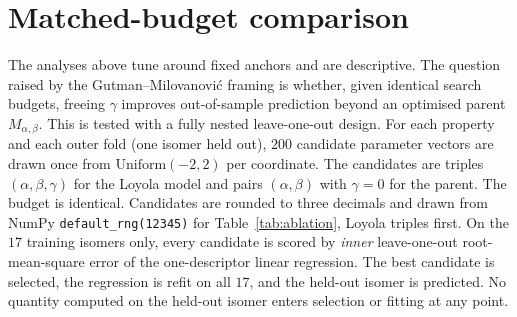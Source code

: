 \documentclass[a5paper, 10pt]{article}
\theoremstyle{plain}
\theoremstyle{remark}
\theoremstyle{definition}
\begin{document}
\section{Matched-budget comparison}\label{sec:s-ablation}

The analyses above tune around fixed anchors and are descriptive.
The question raised by the Gutman--Milovanovi\'c framing is
whether, given identical search budgets, freeing $\gamma$ improves
out-of-sample prediction beyond an optimised parent
$M_{\alpha,\beta}$. This is tested with a fully nested leave-one-out
design. For each property and each outer fold (one isomer held out),
$200$ candidate parameter vectors are drawn once from
$\mathrm{Uniform}(-2,2)$ per coordinate. The candidates are triples
$(\alpha,\beta,\gamma)$ for the Loyola model and pairs $(\alpha,\beta)$
with $\gamma = 0$ for the parent. The budget is identical. Candidates
are rounded to three decimals and drawn from NumPy
\texttt{default\_rng(12345)} for Table~\ref{tab:ablation}, Loyola
triples first. On the $17$ training isomers only, every candidate is
scored by \emph{inner} leave-one-out root-mean-square error of the
one-descriptor linear regression. The best candidate is selected, the
regression is refit on all $17$, and the held-out isomer is predicted.
No quantity computed on the held-out isomer enters selection or fitting
at any point.
\end{document}
